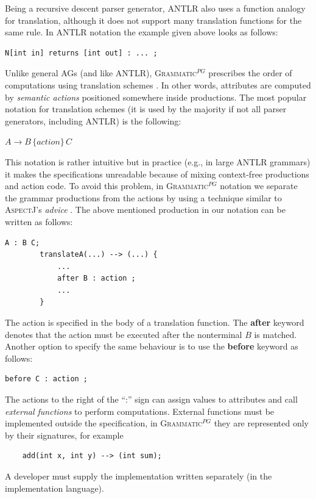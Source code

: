 \documentclass{llncs2e/llncs}
\newcommand{\tool}[1]{\textsc{#1}}
\newcommand{\ATF}{\textsc{Grammatic}$^{PG}$}
\begin{document}
Being a recursive descent parser generator, \tool{ANTLR} also uses a function analogy for translation, although it does not support many translation functions for the same rule. In \tool{ANTLR} notation the example given above looks as follows:
\begin{lstlisting}[language=ANTLR]
	N[int in] returns [int out] : ... ;
\end{lstlisting}

Unlike general AGs (and like \tool{ANTLR}), \ATF{} prescribes the order of computations using translation schemes \cite{DragonBook}. In other words, attributes are computed by \emph{semantic actions} positioned somewhere inside productions. The most popular notation for translation schemes (it is used by the majority if not all parser generators, including \tool{ANTLR}) is the following:

$A \rightarrow B \,\{action\} \,C$

This notation is rather intuitive but in practice (e.g., in large \tool{ANTLR} grammars) it makes the specifications unreadable because of mixing context-free productions and action code. To avoid this problem, in \ATF{} notation we separate the grammar productions from the actions by using a technique similar to \tool{AspectJ}'s \emph{advice} \cite{AspectJ}. The above mentioned production in our notation can be written as follows:

\begin{lstlisting}[emph={action},emphstyle={\it}]
	A : B C;
		translateA(...) --> (...) {
			...
			after B : action ;
			...
		}
\end{lstlisting}

The action is specified in the body of a translation function. The \textbf{after} keyword denotes that the action must be executed after the nonterminal $B$ is matched. Another option to specify the same behaviour is to use the \textbf{before} keyword as follows:

\begin{lstlisting}[emph={action},emphstyle={\it}]
	before C : action ;
\end{lstlisting}

The actions to the right of the ``:'' sign can assign values to attributes and call \emph{external functions} to perform computations. External functions must be implemented outside the specification, in \ATF{} they are represented only by their signatures, for example
\begin{lstlisting}
	add(int x, int y) --> (int sum);
\end{lstlisting}
A developer must supply the implementation written separately (in the implementation language).
\end{document}
